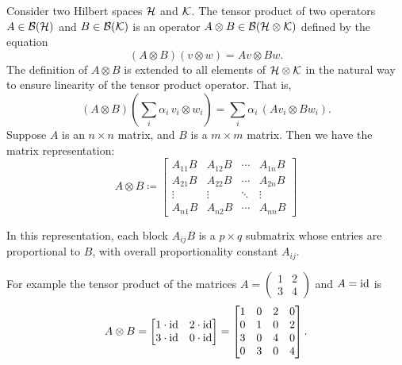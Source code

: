\begin{definition}
  Consider two Hilbert spaces $\mathcal{H}$ and $\mathcal{K}$. 
  The tensor product of two operators $A \in \mathcal{B}(\mathcal{H}) $ and $B \in   \mathcal{B}(\mathcal{K})$ is an operator $A \otimes B \in  \mathcal{B}(\mathcal{H} \otimes \mathcal{K}) $ defined by the equation
\begin{equation*}
  (A \otimes B)(v \otimes w) = Av \otimes Bw.
\end{equation*}
The definition of $A \otimes B$ is extended to all elements of $\mathcal{H} \otimes \mathcal{K}$ in the natural way to ensure linearity of the tensor product operator. That is,
\begin{equation*} \label{eq:linear_tensor_operator}
(A \otimes B) \left( \sum_i \alpha_i\, v_i \otimes w_i \right)
= \sum_i \alpha_i\, (A v_i \otimes B w_i).
\end{equation*}
Suppose $A$ is an $n \times n$ matrix, and $B$ is a $m \times m$ matrix. Then we have the matrix representation:
\begin{equation*} \label{eq:matrix_tensor_product}
A \otimes B \coloneqq
\begin{bmatrix}
A_{11} B & A_{12} B & \cdots & A_{1n} B \\
A_{21} B & A_{22} B & \cdots & A_{2n} B \\
\vdots   & \vdots   & \ddots & \vdots   \\
A_{n1} B & A_{n2} B & \cdots & A_{nn} B
\end{bmatrix}
\end{equation*}

In this representation, each block $A_{ij} B$ is a $p \times q$ submatrix whose entries are proportional to $B$, with overall proportionality constant $A_{ij}$.


For example the tensor product of the matrices $A= \left(\begin{smallmatrix}
    1 & 2 \\
    3 & 4
  \end{smallmatrix}\right) $ and $A=\mathrm{id} $ is
\begin{equation} \label{eq:pauli_tensor}
A \otimes B =
\begin{bmatrix}
1 \cdot \mathrm{id} & 2 \cdot \mathrm{id} \\
3 \cdot \mathrm{id} & 0 \cdot \mathrm{id}
\end{bmatrix}
=
\begin{bmatrix}
1 & 0 & 2 & 0 \\
0 & 1 & 0 & 2 \\
3 & 0 & 4 & 0 \\
0 & 3 & 0 & 4
\end{bmatrix}.
\end{equation}

\end{definition}


